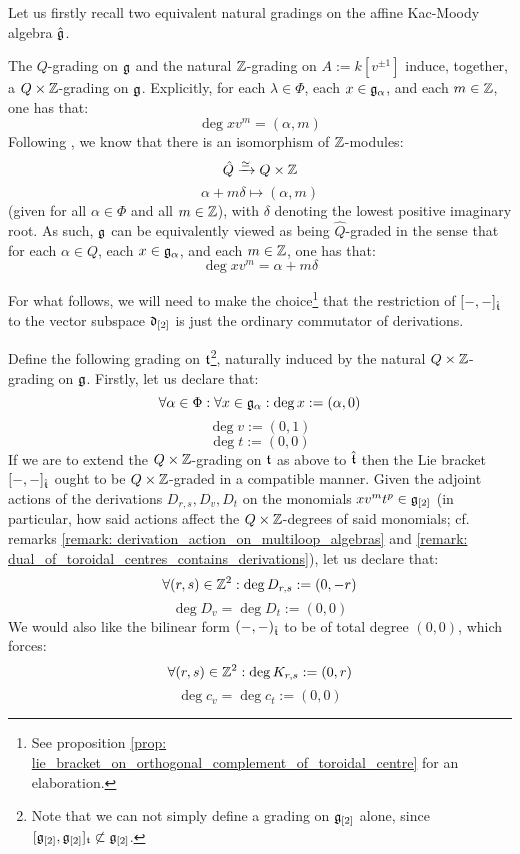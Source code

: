         Let us firstly recall two equivalent natural gradings on the affine Kac-Moody algebra $\hat{\mathfrak{g}}$. 
        \begin{remark}
            The $Q$-grading on $\mathfrak{g}$ and the natural $\mathbb{Z}$-grading on $A := k[v^{\pm 1}]$ induce, together, a $Q \x \Z$-grading on $\mathfrak{g}$. Explicitly, for each $\lambda \in \Phi$, each $x \in \mathfrak{g}_{\alpha}$, and each $m \in \mathbb{Z}$, one has that:
                $$\deg x v^m = (\alpha, m)$$
            Following \cite[Chapter 6]{kac_infinite_dimensional_lie_algebras}, we know that there is an isomorphism of $\mathbb{Z}$-modules:
                $$\hat{Q} \xrightarrow[]{\cong} Q \x \Z$$
                $$\alpha + m\delta \mapsto (\alpha, m)$$
            (given for all $\alpha \in \Phi$ and all $m \in \mathbb{Z}$), with $\delta$ denoting the lowest positive imaginary root. As such, $\mathfrak{g}$ can be equivalently viewed as being $\hat{Q}$-graded in the sense that for each $\alpha \in Q$, each $x \in \mathfrak{g}_{\alpha}$, and each $m \in \mathbb{Z}$, one has that:
                $$\deg x v^m = \alpha + m\delta$$
        \end{remark}
        \begin{proposition} \label{prop: root_grading_on_extended_toroidal_lie_algebras}
            For what follows, we will need to make the choice\footnote{See proposition \ref{prop: lie_bracket_on_orthogonal_complement_of_toroidal_centre} for an elaboration.} that the restriction of $[-, -]_{\hat{\mathfrak{t}}}$ to the vector subspace $\mathfrak{d}_{[2]}$ is just the ordinary commutator of derivations.
        
            Define the following grading on $\mathfrak{t}$\footnote{Note that we can not simply define a grading on $\mathfrak{g}_{[2]}$ alone, since $[\mathfrak{g}_{[2]}, \mathfrak{g}_{[2]}]_{\mathfrak{t}} \not \subset \mathfrak{g}_{[2]}$.}, naturally induced by the natural $Q \x \Z$-grading on $\mathfrak{g}$. Firstly, let us declare that:
                $$\forall \alpha \in \Phi: \forall x \in \mathfrak{g}_{\alpha}: \deg x := (\alpha, 0)$$
                $$\deg v := (0, 1)$$
                $$\deg t := (0, 0)$$
            If we are to extend the $Q \x \Z$-grading on $\mathfrak{t}$ as above to $\hat{\mathfrak{t}}$ then the Lie bracket $[-, -]_{\hat{\mathfrak{t}}}$ ought to be $Q \x \Z$-graded in a compatible manner. Given the adjoint actions of the derivations $D_{r, s}, D_v, D_t$ on the monomials $x v^m t^p \in \mathfrak{g}_{[2]}$ (in particular, how said actions affect the $Q \x \Z$-degrees of said monomials; cf. remarks \ref{remark: derivation_action_on_multiloop_algebras} and \ref{remark: dual_of_toroidal_centres_contains_derivations}), let us declare that:
                $$\forall (r, s) \in \mathbb{Z}^2: \deg D_{r, s} := (0, -r)$$
                $$\deg D_v = \deg D_t := (0, 0)$$
            We would also like the bilinear form $(-, -)_{\hat{\mathfrak{t}}}$ to be of total degree $(0, 0)$, which forces:
                $$\forall (r, s) \in \mathbb{Z}^2: \deg K_{r, s} := (0, r)$$
                $$\deg c_v = \deg c_t := (0, 0)$$
        \end{proposition}
